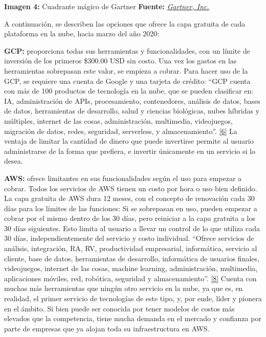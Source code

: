 \documentclass[12pt,spanish,Letterpaper,openany]{book}
\begin{document}


\textbf{Imagen 4:} Cuadrante mágico de Gartner \textbf{Fuente:} \href{https://pages.awscloud.com/}{\emph{Gartner, Inc.}}


A continuación, se describen las opciones que ofrece la capa gratuita de cada plataforma en la nube, hacia marzo del año 2020:

\hypertarget{articulo10_cross06}{}
\hypertarget{articulo10_cross07}{}
\hypertarget{articulo10_cross08}{}

\textbf{GCP:} proporciona todas sus herramientas y funcionalidades, con un límite de inversión de los primeros \$300.00 USD sin costo. Una vez los gastos en las herramientas sobrepasan este valor, se empieza a cobrar. Para hacer uso de la GCP, se requiere una cuenta de Google y una tarjeta de crédito: ``GCP cuenta con más de 100 productos de tecnología en la nube, que se pueden clasificar en: IA, administración de APIs, procesamiento, contenedores, análisis de datos, bases de datos, herramientas de desarrollo, salud y ciencias biológicas, nubes híbridas y múltiples, internet de las cosas, administración, multimedia, videojuegos, migración de datos, redes, seguridad, serverless, y almacenamiento''. \protect\hyperlink{articulo10_ref06}{{[}6{]}} La ventaja de limitar la cantidad de dinero que puede invertirse permite al usuario administrarse de la forma que prefiera, e invertir únicamente en un servicio si lo desea.

\textbf{AWS:} ofrece limitantes en sus funcionalidades según el uso para empezar a cobrar. Todos los servicios de AWS tienen un costo por hora o uso bien definido. La capa gratuita de AWS dura 12 meses, con el concepto de renovación cada 30 días para los límites de las funciones: Si se sobrepasan en uso, pueden empezar a cobrar por el mismo dentro de los 30 días, pero reiniciar a la capa gratuita a los 30 días siguientes. Esto limita al usuario a llevar un control de lo que utiliza cada 30 días, independientemente del servicio y costo individual. ``Ofrece servicios de análisis, integración, RA, RV, productividad empresarial, informática, servicio al cliente, base de datos, herramientas de desarrollo, informática de usuarios finales, videojuegos, internet de las cosas, machine learning, administración, multimedia, aplicaciones móviles, red, robótica, seguridad y almacenamiento''. \protect\hyperlink{articulo10_ref08}{{[}8{]}} Cuenta con muchas más herramientas que ningún otro servicio en la nube, ya que es, en realidad, el primer servicio de tecnologías de este tipo, y, por ende, líder y pionera en el ámbito. Si bien puede ser conocida por tener modelos de costos más elevados que la competencia, tiene mucha demanda en el mercado y confianza por parte de empresas que ya alojan toda su infraestructura en AWS.
\end{document}
